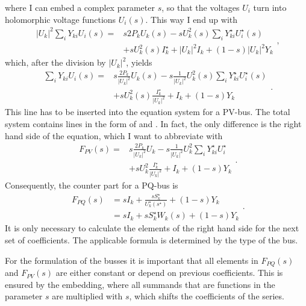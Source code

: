 where I can embed a complex parameter $s$, so that the voltages $U_i$ turn into holomorphic voltage functions $U_i(s)$. This way I end up with
\begin{equation}
	\begin{split}
		|U_k|^2 \sum_i Y_{ki} U_i(s) = 
			& s 2 P_k U_k(s) - s U_k^2(s) \sum_i Y_{ki}^\star U_i^\star(s) \\
			& + s U_k^2(s) I_k^\star + |U_k|^2 I_k + (1 - s) |U_k|^2 Y_k
	\end{split},
\end{equation}
which, after the division by $|U_k|^2$, yields
\begin{equation}
	\begin{split}
		\sum_i Y_{ki} U_i(s) = 
			& s \frac{2 P_k}{|U_k|^2} U_k(s) - s \frac{1}{|U_k|^2} U_k^2(s) \sum_i Y_{ki}^\star U_i^\star(s) \\
			& + s U_k^2(s) \frac{I_k^\star}{|U_k|^2} + I_k + (1 - s) Y_k
	\end{split}.
	\label{eq:pv_bus_helm}
\end{equation}
This line has to be inserted into the equation system for a PV-bus. The total system contains lines in the form of  and . In fact, the only difference is the right hand side of the equation, which I want to abbreviate with
\begin{equation}
	\begin{split}
		F_{PV}(s) = 
			& s \frac{2 P_k}{|U_k|^2} U_k - s \frac{1}{|U_k|^2} U_k^2 \sum_i Y_{ki}^\star U_i^\star \\
			& + s U_k^2 \frac{I_k^\star}{|U_k|^2} + I_k + (1 - s) Y_k
	\end{split}.
	\label{eq:rhs_pv}
\end{equation}
Consequently, the counter part for a PQ-bus is
\begin{equation}
	\begin{split}
		F_{PQ}(s) 	& = s I_k + \frac{s S_k^\star}{U_k^\star(s^\star)} + (1 - s) Y_k \\
				& = s I_k + s S_k^\star W_k(s) + (1 - s) Y_k
	\end{split}.
	\label{eq:rhs_pq}
\end{equation}
It is only necessary to calculate the elements of the right hand side for the next set of coefficients. The applicable formula is determined by the type of the bus.

For the formulation of the busses it is important that all elements in $F_{PQ}(s)$ and $F_{PV}(s)$ are either constant or depend on previous coefficients. This is ensured by the embedding, where all summands that are functions in the parameter $s$ are multiplied with $s$, which shifts the coefficients of the series.

